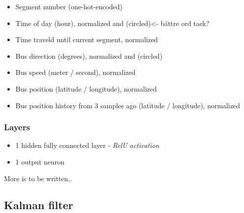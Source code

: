 \begin{itemize}
    \item Segment number (one-hot-encoded)
    \item Time of day (hour), normalized and (circled)<- bättre ord tack?
    \item Time traveld until current segment, normalized
    \item Bus direction (degrees), normalized and (circled)
    \item Bus speed (meter / second), normalized
    \item Bus position (latitude / longitude), normalized
    \item Bus position history from 3 samples ago (latitude / longitude), normalized
\end{itemize}

\subsubsection{Layers}

\begin{itemize}
    \item 1 hidden fully connected layer - \textit{RelU activation}
    \item 1 output neuron
\end{itemize}

More is to be written..


\subsection{Kalman filter}




